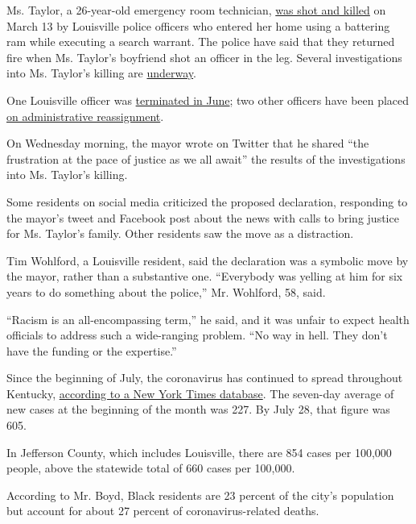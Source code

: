 Ms. Taylor, a 26-year-old emergency room technician,
\href{https://www.nytimes3xbfgragh.onion/2020/05/14/us/breonna-taylor-louisville-shooting.html}{was
shot and killed} on March 13 by Louisville police officers who entered
her home using a battering ram while executing a search warrant. The
police have said that they returned fire when Ms. Taylor's boyfriend
shot an officer in the leg. Several investigations into Ms. Taylor's
killing are
\href{https://twitter.com/louisvillemayor/status/1288464475272679426}{underway}.

One Louisville officer was
\href{https://www.nytimes3xbfgragh.onion/article/breonna-taylor-police.html}{terminated
in June}; two other officers have been placed
\href{https://www.nytimes3xbfgragh.onion/2020/06/23/us/breonna-taylor-brett-hankison-fired.html}{on
administrative reassignment}.

On Wednesday morning, the mayor wrote on Twitter that he shared ``the
frustration at the pace of justice as we all await'' the results of the
investigations into Ms. Taylor's killing.

Some residents on social media criticized the proposed declaration,
responding to the mayor's tweet and Facebook post about the news with
calls to bring justice for Ms. Taylor's family. Other residents saw the
move as a distraction.

Tim Wohlford, a Louisville resident, said the declaration was a symbolic
move by the mayor, rather than a substantive one. ``Everybody was
yelling at him for six years to do something about the police,'' Mr.
Wohlford, 58, said.

``Racism is an all-encompassing term,'' he said, and it was unfair to
expect health officials to address such a wide-ranging problem. ``No way
in hell. They don't have the funding or the expertise.''

Since the beginning of July, the coronavirus has continued to spread
throughout Kentucky,
\href{https://www.nytimes3xbfgragh.onion/interactive/2020/us/kentucky-coronavirus-cases.html\#county}{according
to a New York Times database}. The seven-day average of new cases at the
beginning of the month was 227. By July 28, that figure was 605.

In Jefferson County, which includes Louisville, there are 854 cases per
100,000 people, above the statewide total of 660 cases per 100,000.

According to Mr. Boyd, Black residents are 23 percent of the city's
population but account for about 27 percent of coronavirus-related
deaths.

